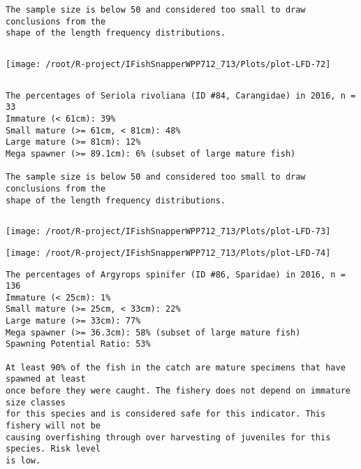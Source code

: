 \documentclass{report}\usepackage[]{graphicx}\usepackage[]{color}
\makeatletter
\def\maxwidth{ %
  \ifdim\Gin@nat@width>\linewidth
    \linewidth
  \else
    \Gin@nat@width
  \fi
}
\newenvironment{kframe}{%
 \def\at@end@of@kframe{}%
 \ifinner\ifhmode%
  \def\at@end@of@kframe{\end{minipage}}%
  \begin{minipage}{\columnwidth}%
 \fi\fi%
 \def\FrameCommand##1{\hskip\@totalleftmargin \hskip-\fboxsep
 \colorbox{shadecolor}{##1}\hskip-\fboxsep
     \hskip-\linewidth \hskip-\@totalleftmargin \hskip\columnwidth}%
 \MakeFramed {\advance\hsize-\width
   \@totalleftmargin\z@ \linewidth\hsize
   \@setminipage}}%
 {\par\unskip\endMakeFramed%
 \at@end@of@kframe}
\newenvironment{knitrout}{}{} %
\makeatother
\begin{document}
\begin{knitrout}
\begin{kframe}
\begin{verbatim}
The sample size is below 50 and considered too small to draw conclusions from the
shape of the length frequency distributions.
\end{verbatim}
\end{kframe}
\newpage
\begin{kframe}\begin{verbatim}
\end{verbatim}
\end{kframe}
\texttt{[image: /root/R-project/IFishSnapperWPP712\_713/Plots/plot-LFD-72]} 
\begin{kframe}\begin{verbatim}
\end{verbatim}
\end{kframe}
\clearpage
\newpage
\begin{kframe}\begin{verbatim}
The percentages of Seriola rivoliana (ID #84, Carangidae) in 2016, n = 33
Immature (< 61cm): 39%
Small mature (>= 61cm, < 81cm): 48%
Large mature (>= 81cm): 12%
Mega spawner (>= 89.1cm): 6% (subset of large mature fish)
 
The sample size is below 50 and considered too small to draw conclusions from the
shape of the length frequency distributions.
\end{verbatim}
\end{kframe}
\newpage
\begin{kframe}\begin{verbatim}
\end{verbatim}
\end{kframe}
\texttt{[image: /root/R-project/IFishSnapperWPP712\_713/Plots/plot-LFD-73]} 

\texttt{[image: /root/R-project/IFishSnapperWPP712\_713/Plots/plot-LFD-74]} 
\begin{kframe}\begin{verbatim}
The percentages of Argyrops spinifer (ID #86, Sparidae) in 2016, n = 136
Immature (< 25cm): 1%
Small mature (>= 25cm, < 33cm): 22%
Large mature (>= 33cm): 77%
Mega spawner (>= 36.3cm): 58% (subset of large mature fish)
Spawning Potential Ratio: 53%
 
At least 90% of the fish in the catch are mature specimens that have spawned at least
once before they were caught. The fishery does not depend on immature size classes
for this species and is considered safe for this indicator. This fishery will not be
causing overfishing through over harvesting of juveniles for this species. Risk level
is low.


\end{verbatim}
\end{kframe}
\end{knitrout}
\end{document}
